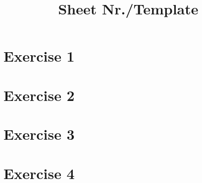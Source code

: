 \documentclass[bibliography=totocnumbered]{scrartcl}
\title{Sheet Nr./Template}
\begin{document}
    \maketitle
    \tableofcontents
    \listoffigures
    
    \newpage
    \section{Exercise 1}

    \newpage
    \section{Exercise 2}

    \newpage
    \section{Exercise 3}

    \newpage
    \section{Exercise 4}

    \newpage
    \appendix
    \printbibliography[title={Sources}]
\end{document}
